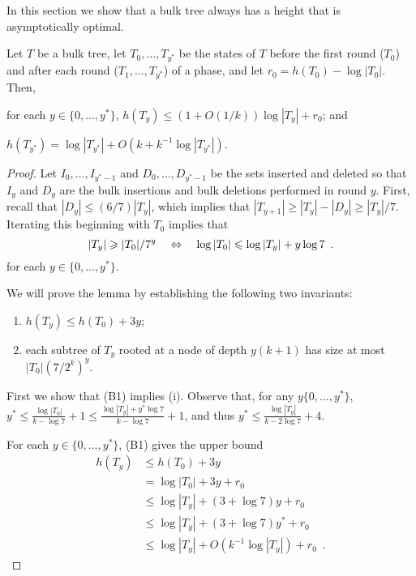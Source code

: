 \documentclass[kpfonts]{patmorin}
\let\le\leqslant
\let\ge\geqslant
\begin{document}
In this section we show that a bulk tree always has a height that is asymptotically optimal.

\begin{lem}
  Let $T$ be a bulk tree, let $T_0,\ldots,T_{y^*}$ be the states of $T$ before the first round ($T_0$) and after each round ($T_1,\ldots,T_{y^*}$) of a phase, and let $r_0=h(T_0)-\log|T_0|$.  Then,
  \begin{compactenum}[(i)]
    \item for each $y\in\{0,\ldots,y^*\}$, $h(T_y)\le (1+O(1/k))\log|T_y| + r_0$; and
    \item $h(T_{y^*}) = \log|T_{y^*}|+O(k+k^{-1}\log|T_{y^*}|)$.
  \end{compactenum}
\end{lem}

\begin{proof}
  Let $I_0,\ldots,I_{y^*-1}$ and $D_0,\ldots,D_{y^*-1}$ be the sets inserted and deleted so that $I_y$ and $D_y$ are the bulk insertions and bulk deletions performed in round $y$.  First, recall that $|D_y|\le (6/7)|T_y|$, which implies that $|T_{y+1}|\ge |T_y|-|D_y|\ge |T_y|/7$.  Iterating this beginning with $T_0$ implies that 
  \begin{equation}
    |T_y|\ge |T_0|/7^y \quad \Leftrightarrow \quad \log|T_0| \le \log|T_y| + y\log 7 \enspace . \eqlabel{height-diff}
  \end{equation}
  for each $y\in\{0,\ldots,y^*\}$. 


  We will prove the lemma by establishing the following two invariants:
  \begin{enumerate}[(B1)]
    \item $h(T_y)\le h(T_0) + 3y$;
    \item each subtree of $T_y$ rooted at a node of depth $y(k+1)$ has size at most $|T_0|(7/2^k)^{y}$.
  \end{enumerate}

  First we show that (B1) implies (i). Observe that, for any $y\{0,\ldots,y^*\}$,  $y^*\le \tfrac{\log |T_0|}{k-\log 7}+1\le \tfrac{\log |T_y|+y^*\log 7}{k-\log 7}+1$, and thus $y^*\le \tfrac{\log |T_y|}{k-2\log 7}+4$.


  For each  $y\in\{0,\ldots,y^*\}$, (B1) gives the upper bound
  \begin{align}
       h(T_y) & \le h(T_0) + 3y \nonumber \\
              &= \log|T_0| + 3y + r_0 \nonumber \\
              &\le \log |T_y| + (3+\log 7)y + r_0 \nonumber \\
              &\le \log |T_y| + (3+\log 7)y^* + r_0 \nonumber \\
              &\le \log |T_y| + O(k^{-1}\log|T_y|) + r_0 \enspace .
  \end{align}


\end{proof}
\end{document}
